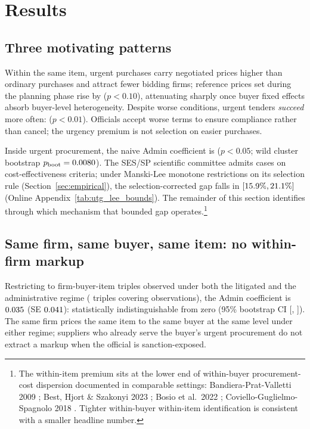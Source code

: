 \section{Results}
\label{sec:results}

\subsection{Three motivating patterns}
\label{sec:main_results}

Within the same item, urgent purchases carry negotiated prices
\BPnegPctHeadline{} higher than ordinary purchases and attract
\BPfirmsPctHeadline{} fewer bidding firms; reference prices set
during the planning phase rise by \BPrefPctPreferred{} ($p<0.10$),
attenuating sharply once buyer fixed effects absorb buyer-level
heterogeneity. Despite worse conditions, urgent tenders \emph{succeed}
more often: \BPsuccessPP{} ($p<0.01$). Officials accept worse terms
to ensure compliance rather than cancel; the urgency premium is not
selection on easier purchases.

Inside urgent procurement, the naive Admin coefficient is
\BPutgPointNaive{} ($p<0.05$; wild cluster bootstrap
$p_{\text{boot}}=0.0080$). The SES/SP scientific
committee admits cases on cost-effectiveness criteria; under
Manski-Lee monotone restrictions on its selection rule
(Section~\ref{sec:empirical}), the selection-corrected gap falls in
$[15.9\%, 21.1\%]$ (Online
Appendix~\ref{tab:utg_lee_bounds}). The remainder of this section
identifies through which mechanism that bounded gap operates.\footnote{The
\BPnegPctHeadline{} within-item premium sits at the lower end of
within-buyer procurement-cost dispersion documented in comparable
settings: Bandiera-Prat-Valletti 2009 \BPbpvBaseline; Best, Hjort \&
Szakonyi 2023 \BPbhsBaseline; Bosio et al.\ 2022 \BPbosioBaseline;
Coviello-Guglielmo-Spagnolo 2018 \BPcgsBaseline. Tighter within-buyer
within-item identification is consistent with a smaller headline
number.}


\subsection{Same firm, same buyer, same item: no within-firm markup}
\label{sec:within_firm_null}

Restricting to firm-buyer-item triples observed under both the
litigated and the administrative regime
(\BPutgTripleCountUTG{} triples covering \BPutgTripleNUTG{}
observations), the Admin coefficient is $0.035$ (SE
$0.041$): statistically indistinguishable from zero
(95\% bootstrap CI [\BPutgWithinCIlow, \BPutgWithinCIhigh]). The
same firm prices the same item to the same buyer at the same level
under either regime; suppliers who already serve the buyer's urgent
procurement do not extract a markup when the official is
sanction-exposed.

